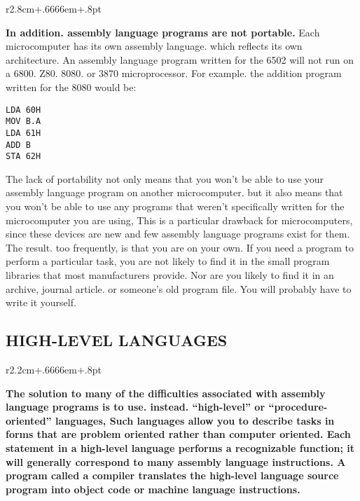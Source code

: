 \documentclass{book}
\begin{document}
\begin{wrapfigure}{r}{2.8cm+.6666em+.8pt}
\end{wrapfigure}
\textbf{In addition. assembly language programs are not portable.} Each microcomputer has its own assembly language. which reflects its own architecture. An assembly language program written for the 6502 will not run on a 6800. Z80. 8080. or 3870 microprocessor. For example. the addition program written for the 8080 would be:
\begin{verbatim}
LDA 60H
MOV B.A
LDA 61H
ADD B
STA 62H
\end{verbatim}
The lack of portability not only means that you won't be able to use your assembly
language program on another microcomputer. but it also means that you won't be able
to use any programs that weren't specifically written for the microcomputer you are
using, This is a particular drawback for microcomputers, since these devices are new
and few assembly language programs exist for them. The result. too frequently, is that
you are on your own. If you need a program to perform a particular task, you are not
likely to find it in the small program libraries that most manufacturers provide. Nor are
you likely to find it in an archive, journal article. or someone's old program file. You will
probably have to write it yourself.

\subsection*{HIGH-LEVEL LANGUAGES}
\begin{wrapfigure}{r}{2.2cm+.6666em+.8pt}
\end{wrapfigure}
\textbf{The solution to many of the difficulties associated with assembly language programs is to use. instead. “high-level” or “procedure-oriented” languages, Such languages allow you to describe tasks in forms that are problem oriented rather than computer oriented. Each statement in a high-level language performs a recognizable function; it will generally correspond to many assembly language instructions. A program called a compiler translates the high-level language source program into object code or machine language instructions.}
\end{document}
